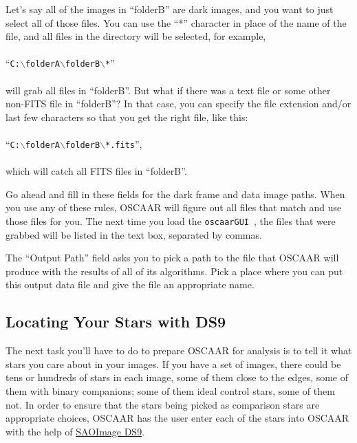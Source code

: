 \documentclass[a4paper]{article}
\newcommand{\code}[1]{\texttt{#1}}
\newcommand{\gui}{\code{oscaarGUI}~}
\begin{document}
Let's say all of the images in ``folderB'' are dark images, and you want to just select all of those files. You can use the ``*'' character in place of the name of the file, and all files in the directory will be selected, for example, 
\\\\
\noindent ``\code{C:$\backslash$folderA$\backslash$folderB$\backslash$*}'' 
\\\\
\noindent will grab all files in ``folderB''. But what if there was a text file or some other non-FITS file in ``folderB''? In that case, you can specify the file extension and/or last few characters so that you get the right file, like this: 
\\\\
\noindent ``\code{C:$\backslash$folderA$\backslash$folderB$\backslash$*.fits}'', 
\\\\
\noindent which will catch all FITS files in ``folderB''.

Go ahead and fill in these fields for the dark frame and data image paths. When you use any of these rules, OSCAAR will figure out all files that match and use those files for you. The next time you load the \gui, the files that were grabbed will be listed in the text box, separated by commas. 

The ``Output Path'' field asks you to pick a path to the file that OSCAAR will produce with the results of all of its algorithms. Pick a place where you can put this output data file and give the file an appropriate name.

\subsection{Locating Your Stars with DS9} \label{sec:locatingStars}

The next task you'll have to do to prepare OSCAAR for analysis is to tell it what stars you care about in your images. If you have a set of images, there could be tens or hundreds of stars in each image, some of them close to the edges, some of them with binary companions; some of them ideal control stars, some of them not. In order to ensure that the stars being picked as comparison stars are appropriate choices, OSCAAR has the user enter each of the stars into OSCAAR with the help of \href{http://hea-www.harvard.edu/RD/ds9/site/Home.html}{SAOImage DS9}. 
\end{document}
